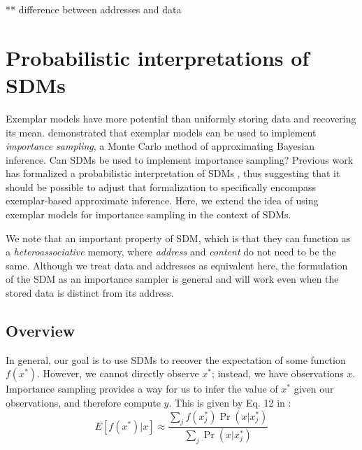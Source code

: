 \documentclass[10pt,letterpaper]{article}
\begin{document}


** difference between addresses and data \\



\section{Probabilistic interpretations of SDMs}

Exemplar models have more potential than uniformly storing data and
recovering its mean.  demonstrated that exemplar models
can be used to implement \textit{importance sampling}, a Monte Carlo
method of approximating Bayesian inference.  Can SDMs be used to
implement importance sampling? Previous work has formalized a
probabilistic interpretation of SDMs \cite{Anderson1989}, thus
suggesting that it should be possible to adjust that formalization to
specifically encompass exemplar-based approximate inference. Here, we
extend the idea of using exemplar models for importance sampling in
the context of SDMs.

We note that an important property of SDM, which is that they can
function as a \textit{heteroassociative} memory, where
\textit{address} and \textit{content} do not need to be the
same. Although we treat data and addresses as equivalent here, the
formulation of the SDM as an importance sampler is general and will
work even when the stored data is distinct from its address.

\subsection{Overview}

In general, our goal is to use SDMs to recover the expectation of some
function $f(x^*)$. However, we cannot directly observe $x^*$; instead,
we have observations $x$. Importance sampling provides a way for us to
infer the value of $x^*$ given our observations, and therefore compute
$y$. This is given by Eq. 12 in :
\begin{equation}
E[f(x^*)|x]\approx \frac{\sum_j f(x_j^*)\Pr(x|x_j^*)}{\sum_j \Pr(x|x_j^*)}
\end{equation}
\end{document}
